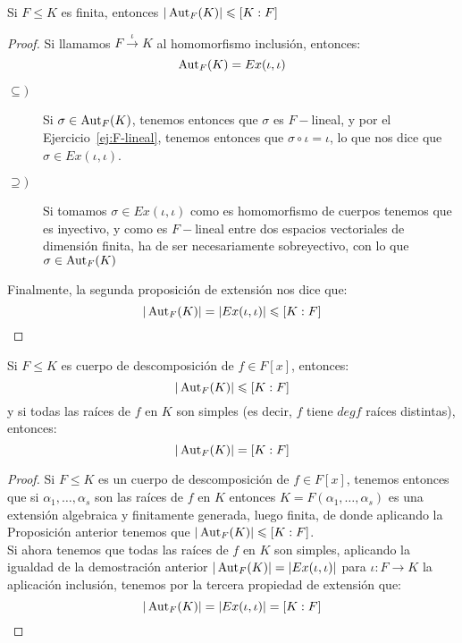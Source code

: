 \begin{prop}\label{prop:comienzo_chap_2}
    Si $F\leq K$ es finita, entonces $|\operatorname{Aut}_F(K)| \leqslant [K:F]$
    \begin{proof}
        Si llamamos $F\stackrel{\iota}{\to}K$ al homomorfismo inclusión, entonces:
        \begin{equation*}
            \operatorname{Aut}_F(K) = Ex(\iota, \iota)
        \end{equation*}
        \begin{description}
            \item [$\subseteq )$] Si $\sigma\in \operatorname{Aut}_F(K)$, tenemos entonces que $\sigma$ es $F-$lineal, y por el Ejercicio~\ref{ej:F-lineal}, tenemos entonces que $\sigma\circ\iota = \iota$, lo que nos dice que $\sigma\in Ex(\iota,\iota)$.
            \item [$\supseteq )$] Si tomamos $\sigma\in Ex(\iota,\iota)$ como es homomorfismo de cuerpos tenemos que es inyectivo, y como es $F-$lineal entre dos espacios vectoriales de dimensión finita, ha de ser necesariamente sobreyectivo, con lo que $\sigma\in \operatorname{Aut}_F(K)$
        \end{description}
        Finalmente, la segunda proposición de extensión nos dice que:
        \begin{equation*}
            |\operatorname{Aut}_F(K)| = |Ex(\iota,\iota)| \leqslant [K:F]
        \end{equation*}
    \end{proof}
\end{prop}

\begin{prop}\label{prop:cuerpo_desc_aut_f_lin}
    Si $F\leq K$ es cuerpo de descomposición de $f\in F[x]$, entonces: 
    \begin{equation*}
        |\operatorname{Aut}_F(K)| \leqslant [K:F]
    \end{equation*}
    y si todas las raíces de $f$ en $K$ son simples (es decir, $f$ tiene $degf$ raíces distintas), entonces:
    \begin{equation*}
        |\operatorname{Aut}_F(K)| = [K:F]
    \end{equation*}
    \begin{proof}
        Si $F\leq K$ es un cuerpo de descomposición de $f\in F[x]$, tenemos entonces que si $\alpha_1, \ldots, \alpha_s$ son las raíces de $f$ en $K$ entonces $K = F(\alpha_1, \ldots, \alpha_s)$ es una extensión algebraica y finitamente generada, luego finita, de donde aplicando la Proposición anterior tenemos que $|\operatorname{Aut}_F(K)|\leqslant [K:F]$.\\

        \noindent
        Si ahora tenemos que todas las raíces de $f$ en $K$ son simples, aplicando la igualdad de la demostración anterior $|\operatorname{Aut}_F(K)| = |Ex(\iota,\iota)|$ para $\iota:F\to K$ la aplicación inclusión, tenemos por la tercera propiedad de extensión que:
        \begin{equation*}
            |\operatorname{Aut}_F(K)| = |Ex(\iota,\iota)| = [K:F]
        \end{equation*}
    \end{proof}
\end{prop}

